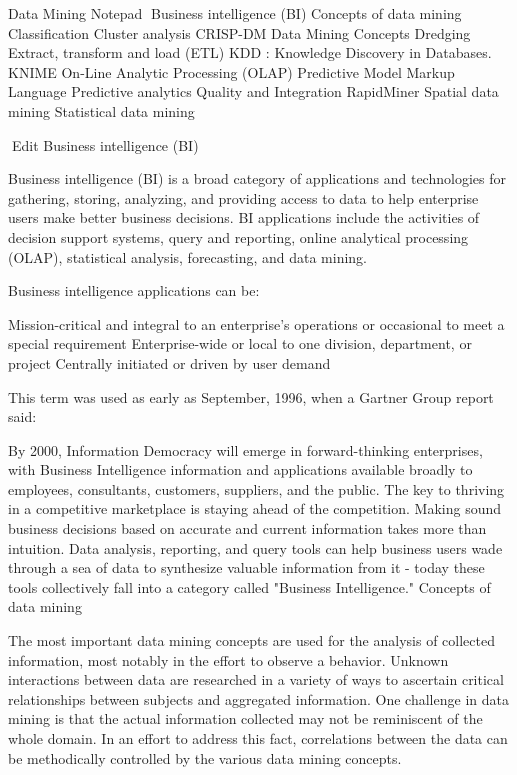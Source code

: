 Data Mining Notepad
Business intelligence (BI)
Concepts of data mining
Classification
Cluster analysis
CRISP-DM
Data Mining Concepts
Dredging
Extract, transform and load (ETL)
KDD : Knowledge Discovery in Databases.
KNIME
On-Line Analytic Processing (OLAP)
Predictive Model Markup Language
Predictive analytics
Quality and Integration
RapidMiner
Spatial data mining
Statistical data mining

Edit
Business intelligence (BI) 

Business intelligence (BI) is a broad category of applications and technologies for gathering, storing, analyzing, and providing access to data to help enterprise users make better business decisions. BI applications include the activities of decision support systems, query and reporting, online analytical processing (OLAP), statistical analysis, forecasting, and data mining.

Business intelligence applications can be:

Mission-critical and integral to an enterprise's operations or occasional to meet a special requirement
Enterprise-wide or local to one division, department, or project
Centrally initiated or driven by user demand

This term was used as early as September, 1996, when a Gartner Group report said:

By 2000, Information Democracy will emerge in forward-thinking enterprises, with Business Intelligence information and applications available broadly to employees, consultants, customers, suppliers, and the public. The key to thriving in a competitive marketplace is staying ahead of the competition. Making sound business decisions based on accurate and current information takes more than intuition. Data analysis, reporting, and query tools can help business users wade through a sea of data to synthesize valuable information from it - today these tools collectively fall into a category called "Business Intelligence."
Concepts of data mining

The most important data mining concepts are used for the analysis of collected information, most notably in the effort to observe a behavior. Unknown interactions between data are researched in a variety of ways to ascertain critical relationships between subjects and aggregated information. One challenge in data mining is that the actual information collected may not be reminiscent of the whole domain. In an effort to address this fact, correlations between the data can be methodically controlled by the various data mining concepts.

